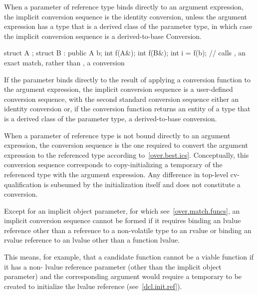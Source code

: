 \pnum
When a parameter of reference type binds directly to an
argument expression, the implicit conversion sequence is the identity conversion,
unless the argument expression has a type that is a derived class of the parameter
type, in which case the implicit conversion sequence is a derived-to-base
Conversion.
\begin{example}

\begin{codeblock}
struct A {};
struct B : public A {} b;
int f(A&);
int f(B&);
int i = f(b);       // calls , an exact match, rather than , a conversion
\end{codeblock}
\end{example}
If the parameter binds directly to the result of
applying a conversion function to the argument expression, the implicit
conversion sequence is a user-defined conversion sequence,
with the second standard conversion sequence either an identity conversion or,
if the conversion function returns an entity of a type that is a derived class
of the parameter type, a derived-to-base conversion.

\pnum
When a parameter of reference type is not bound directly to an argument
expression, the conversion sequence is the one required to convert the argument
expression to the referenced type according to~\ref{over.best.ics}.
Conceptually, this conversion sequence corresponds to copy-initializing a
temporary of the referenced type with the argument expression.
Any difference
in top-level cv-qualification is subsumed by the initialization itself and
does not constitute a conversion.

\pnum
Except for an implicit object parameter, for which see~\ref{over.match.funcs},
an implicit conversion sequence cannot be formed if it requires
binding an lvalue reference
other than a reference to a non-volatile  type
to an rvalue
or binding an rvalue reference to an lvalue other than a function lvalue.
\begin{note}
This means, for example, that a candidate function cannot be a viable
function if it has a non- lvalue reference parameter (other than
the implicit object parameter) and the corresponding argument
would require a temporary to be created to initialize the lvalue
reference (see~\ref{dcl.init.ref}).
\end{note}

